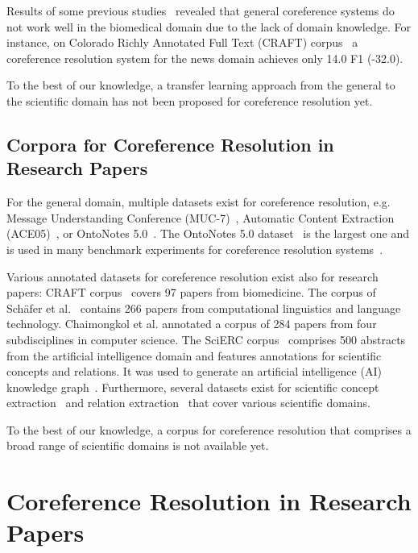 \documentclass[runningheads]{llncs}
\begin{document}
Results of some previous studies~\cite{CohenLCBBPVPH17Craft,NguyenKMMT12,KimNWTTY12,SchaferSS12CorefACL} revealed that general coreference systems do not work well in the biomedical domain due to the lack of domain knowledge. For instance, on Colorado Richly Annotated Full Text (CRAFT) corpus~\cite{CohenLCBBPVPH17Craft} a coreference resolution system for the news domain achieves only 14.0 F1 (-32.0).

To the best of our knowledge, a transfer learning approach from the general to the scientific domain has not been proposed for coreference resolution yet.


\subsection{Corpora for Coreference Resolution in Research Papers}
For the general domain, multiple datasets exist for coreference resolution, e.g. Message Understanding Conference (MUC-7)~\cite{Mikheev1998SeventhMU}, Automatic Content Extraction (ACE05)~\cite{Doddington2004TheAC}, or OntoNotes 5.0~\cite{Pradhan2013TowardsRL}. The OntoNotes 5.0 dataset~\cite{Pradhan2013TowardsRL} is the largest one and is used in many benchmark experiments for coreference resolution systems~\cite{Lee2017EndtoendNC,Joshi2020BFCR,Ma0LHPSL20JointlyCoreference}. 

Various annotated datasets for coreference resolution exist also for research papers:
CRAFT corpus~\cite{CohenLCBBPVPH17Craft} covers 97 papers from biomedicine.
The corpus of Schäfer et al.~\cite{SchaferSS12CorefACL} contains 266 papers from computational linguistics and language technology.
Chaimongkol et al. \cite{ChaimongkolAT14Corpus} annotated a corpus of 284 papers from four subdisciplines in computer science.
The SciERC corpus~\cite{Luan2018MultiTaskIO} comprises 500 abstracts from the artificial intelligence domain and features annotations for scientific concepts and relations. It was used to generate an artificial intelligence (AI) knowledge graph~\cite{Dessi2020AIKG}.
Furthermore, several datasets exist for scientific concept extraction~\cite{augenstein2017semeval,Luan2018MultiTaskIO,Brack2020DomainindependentEO,handschuh2014acl} and relation extraction~\cite{Luan2018MultiTaskIO,gabor2018semeval,augenstein2017semeval} that cover various scientific domains.


To the best of our knowledge, a corpus for coreference resolution that comprises a broad range of scientific domains is not available yet.

\section{Coreference Resolution in Research Papers}
\end{document}
